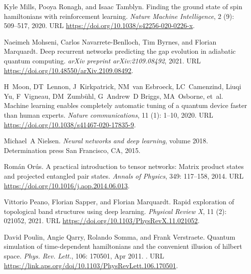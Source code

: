 \documentclass[a4paper,aps,amsmath,amssymb,twocolumn,longbibliography,,accepted=2022-05-17]{quantumarticle}
\begin{document}
\begin{thebibliography}{52}
Kyle Mills, Pooya Ronagh, and Isaac Tamblyn.
\newblock Finding the ground state of spin hamiltonians with reinforcement
  learning.
\newblock \emph{Nature Machine Intelligence}, 2 (9):
  509--517, 2020.
\newblock URL \url{https://doi.org/10.1038/s42256-020-0226-x}.

Naeimeh Mohseni, Carlos Navarrete-Benlloch, Tim Byrnes, and Florian Marquardt.
\newblock Deep recurrent networks predicting the gap evolution in adiabatic
  quantum computing.
\newblock \emph{arXiv preprint arXiv:2109.08492}, 2021.
\newblock URL \url{https://doi.org/10.48550/arXiv.2109.08492}.

H~Moon, DT~Lennon, J~Kirkpatrick, NM~van Esbroeck, LC~Camenzind, Liuqi Yu,
  F~Vigneau, DM~Zumb{\"u}hl, G~Andrew~D Briggs, MA~Osborne, et~al.
\newblock Machine learning enables completely automatic tuning of a quantum
  device faster than human experts.
\newblock \emph{Nature communications}, 11 (1): 1--10, 2020.
\newblock URL \url{https://doi.org/10.1038/s41467-020-17835-9}.

Michael~A Nielsen.
\newblock \emph{Neural networks and deep learning}, volume 2018.
\newblock Determination press San Francisco, CA, 2015.

Rom{\'a}n Or{\'u}s.
\newblock A practical introduction to tensor networks: Matrix product states
  and projected entangled pair states.
\newblock \emph{Annals of Physics}, 349: 117--158, 2014.
\newblock URL \url{https://doi.org/10.1016/j.aop.2014.06.013}.

Vittorio Peano, Florian Sapper, and Florian Marquardt.
\newblock Rapid exploration of topological band structures using deep learning.
\newblock \emph{Physical Review X}, 11 (2): 021052, 2021.
\newblock URL \url{https://doi.org/10.1103/PhysRevX.11.021052}.

David Poulin, Angie Qarry, Rolando Somma, and Frank Verstraete.
\newblock Quantum simulation of time-dependent hamiltonians and the convenient
  illusion of hilbert space.
\newblock \emph{Phys. Rev. Lett.}, 106: 170501, Apr 2011.
\newblock {}.
\newblock URL \url{https://link.aps.org/doi/10.1103/PhysRevLett.106.170501}.


\end{thebibliography}
\end{document}
